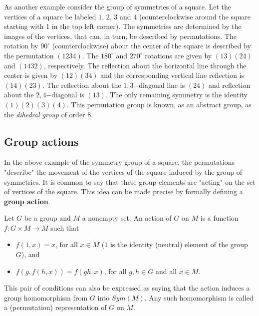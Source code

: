 As another example consider the group of symmetries of a square. Let the vertices of a square be
labeled $1$, $2$, $3$ and $4$ (counterclockwise around the square starting with 1 in the top left corner).
The symmetries are determined by the images of the vertices, that can, in turn, be described by permutations.
The rotation by $90^\circ$ (counterclockwise) about the center of the square is described by the permutation
$(1234)$. The $180^\circ$ and $270^\circ$ rotations are given by $(13)(24)$ and $(1432)$, respectively.
The reflection about the horizontal line through the center is given by $(12)(34)$ and the corresponding
vertical line reflection is $(14)(23)$. The reflection about the $1,3$−diagonal line is $(24)$ and reflection
about the $2,4$−diagonal is $(13)$. The only remaining symmetry is the identity $(1)(2)(3)(4)$.
This permutation group is known, as an abstract group, as the \textit{dihedral group} of order $8$.

\subsection{Group actions}
In the above example of the symmetry group of a square, the permutations "describe" the movement of the vertices
of the square induced by the group of symmetries. It is common to say that these group elements are "acting" on
the set of vertices of the square. This idea can be made precise by formally defining a \textbf{group action}.

Let $G$ be a group and $M$ a nonempty set. An action of $G$ on $M$ is a function $f: G\times M\rightarrow M$
such that
\begin{itemize}
    \item $f(1, x) = x$, for all $x\in M$ ($1$ is the identity (neutral) element of the group $G$), and
    \item $f(g, f(h, x)) = f(gh, x)$, for all $g,h\in G$ and all $x\in M$.
\end{itemize}
This pair of conditions can also be expressed as saying that the action induces a group homomorphism from $G$
into $Sym(M)$. Any such homomorphism is called a (permutation) representation of $G$ on $M$.

